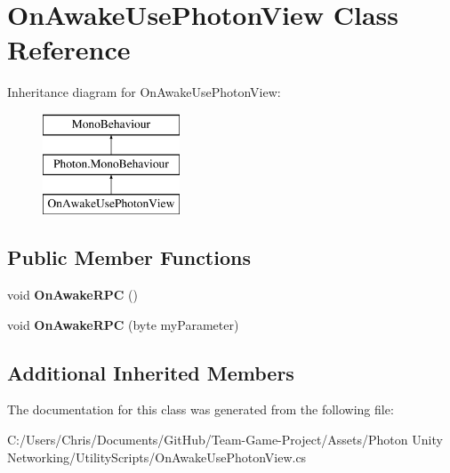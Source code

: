 \hypertarget{class_on_awake_use_photon_view}{}\section{On\+Awake\+Use\+Photon\+View Class Reference}
\label{class_on_awake_use_photon_view}
Inheritance diagram for On\+Awake\+Use\+Photon\+View\+:\begin{figure}[H]
\begin{center}
\leavevmode
\includegraphics[height=3.000000cm]{class_on_awake_use_photon_view}
\end{center}
\end{figure}
\subsection*{Public Member Functions}
\begin{DoxyCompactItemize}
\item 
void {\bfseries On\+Awake\+R\+PC} ()\hypertarget{class_on_awake_use_photon_view_aff099e6fc255e9fd0ade99a97df6d21c}{}\label{class_on_awake_use_photon_view_aff099e6fc255e9fd0ade99a97df6d21c}

\item 
void {\bfseries On\+Awake\+R\+PC} (byte my\+Parameter)\hypertarget{class_on_awake_use_photon_view_a3cbff5428306b93a893524f2d189c0d9}{}\label{class_on_awake_use_photon_view_a3cbff5428306b93a893524f2d189c0d9}

\end{DoxyCompactItemize}
\subsection*{Additional Inherited Members}


The documentation for this class was generated from the following file\+:\begin{DoxyCompactItemize}
\item 
C\+:/\+Users/\+Chris/\+Documents/\+Git\+Hub/\+Team-\/\+Game-\/\+Project/\+Assets/\+Photon Unity Networking/\+Utility\+Scripts/On\+Awake\+Use\+Photon\+View.\+cs\end{DoxyCompactItemize}
